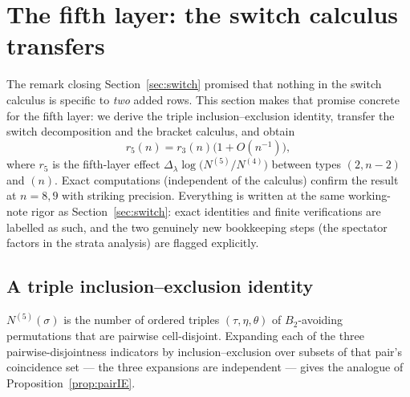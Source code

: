 \section{The fifth layer: the switch calculus transfers}\label{sec:fifth}

The remark closing Section~\ref{sec:switch} promised that nothing in the
switch calculus is specific to \emph{two} added rows.  This section makes
that promise concrete for the fifth layer: we derive the triple
inclusion--exclusion identity, transfer the switch decomposition and the
bracket calculus, and obtain
\begin{equation}\label{eq:r5thm}
r_5(n)=r_3(n)\bigl(1+O(n^{-1})\bigr),
\end{equation}
where $r_5$ is the fifth-layer effect
$\Delta_\lambda\log\bigl(N^{(5)}/N^{(4)}\bigr)$ between types $(2,n{-}2)$
and $(n)$.  Exact computations (independent of the calculus) confirm the
result at $n=8,9$ with striking precision.  Everything is written at the
same working-note rigor as Section~\ref{sec:switch}: exact identities and
finite verifications are labelled as such, and the two genuinely new
bookkeeping steps (the spectator factors in the strata analysis) are
flagged explicitly.

\subsection{A triple inclusion--exclusion identity}

$N^{(5)}(\sigma)$ is the number of ordered triples $(\tau,\eta,\theta)$
of $B_2$-avoiding permutations that are pairwise cell-disjoint.
Expanding each of the three pairwise-disjointness indicators by
inclusion--exclusion over subsets of that pair's coincidence set --- the
three expansions are independent --- gives the analogue of
Proposition~\ref{prop:pairIE}.

